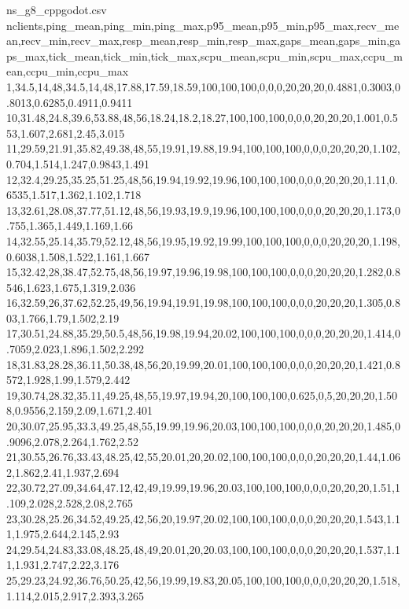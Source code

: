 
\begin{filecontents*}[overwrite]{ns_g8_cppgodot.csv}
nclients,ping_mean,ping_min,ping_max,p95_mean,p95_min,p95_max,recv_mean,recv_min,recv_max,resp_mean,resp_min,resp_max,gaps_mean,gaps_min,gaps_max,tick_mean,tick_min,tick_max,scpu_mean,scpu_min,scpu_max,ccpu_mean,ccpu_min,ccpu_max
1,34.5,14,48,34.5,14,48,17.88,17.59,18.59,100,100,100,0,0,0,20,20,20,0.4881,0.3003,0.8013,0.6285,0.4911,0.9411
10,31.48,24.8,39.6,53.88,48,56,18.24,18.2,18.27,100,100,100,0,0,0,20,20,20,1.001,0.553,1.607,2.681,2.45,3.015
11,29.59,21.91,35.82,49.38,48,55,19.91,19.88,19.94,100,100,100,0,0,0,20,20,20,1.102,0.704,1.514,1.247,0.9843,1.491
12,32.4,29.25,35.25,51.25,48,56,19.94,19.92,19.96,100,100,100,0,0,0,20,20,20,1.11,0.6535,1.517,1.362,1.102,1.718
13,32.61,28.08,37.77,51.12,48,56,19.93,19.9,19.96,100,100,100,0,0,0,20,20,20,1.173,0.755,1.365,1.449,1.169,1.66
14,32.55,25.14,35.79,52.12,48,56,19.95,19.92,19.99,100,100,100,0,0,0,20,20,20,1.198,0.6038,1.508,1.522,1.161,1.667
15,32.42,28,38.47,52.75,48,56,19.97,19.96,19.98,100,100,100,0,0,0,20,20,20,1.282,0.8546,1.623,1.675,1.319,2.036
16,32.59,26,37.62,52.25,49,56,19.94,19.91,19.98,100,100,100,0,0,0,20,20,20,1.305,0.803,1.766,1.79,1.502,2.19
17,30.51,24.88,35.29,50.5,48,56,19.98,19.94,20.02,100,100,100,0,0,0,20,20,20,1.414,0.7059,2.023,1.896,1.502,2.292
18,31.83,28.28,36.11,50.38,48,56,20,19.99,20.01,100,100,100,0,0,0,20,20,20,1.421,0.8572,1.928,1.99,1.579,2.442
19,30.74,28.32,35.11,49.25,48,55,19.97,19.94,20,100,100,100,0.625,0,5,20,20,20,1.508,0.9556,2.159,2.09,1.671,2.401
20,30.07,25.95,33.3,49.25,48,55,19.99,19.96,20.03,100,100,100,0,0,0,20,20,20,1.485,0.9096,2.078,2.264,1.762,2.52
21,30.55,26.76,33.43,48.25,42,55,20.01,20,20.02,100,100,100,0,0,0,20,20,20,1.44,1.062,1.862,2.41,1.937,2.694
22,30.72,27.09,34.64,47.12,42,49,19.99,19.96,20.03,100,100,100,0,0,0,20,20,20,1.51,1.109,2.028,2.528,2.08,2.765
23,30.28,25.26,34.52,49.25,42,56,20,19.97,20.02,100,100,100,0,0,0,20,20,20,1.543,1.11,1.975,2.644,2.145,2.93
24,29.54,24.83,33.08,48.25,48,49,20.01,20,20.03,100,100,100,0,0,0,20,20,20,1.537,1.11,1.931,2.747,2.22,3.176
25,29.23,24.92,36.76,50.25,42,56,19.99,19.83,20.05,100,100,100,0,0,0,20,20,20,1.518,1.114,2.015,2.917,2.393,3.265

\end{filecontents*}
